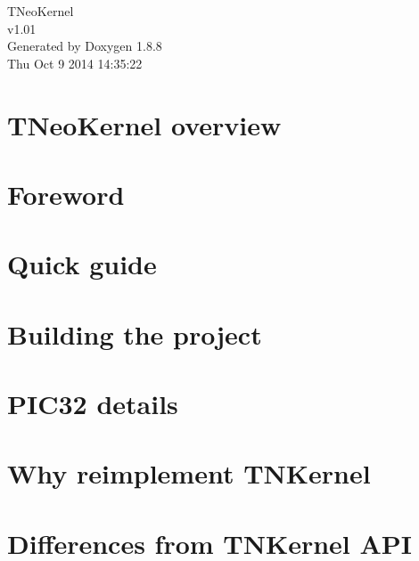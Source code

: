 \documentclass[twoside]{book}
\newcommand{\+}{\discretionary{\mbox{\scriptsize$\hookleftarrow$}}{}{}}
\newcommand{\clearemptydoublepage}{%
  \newpage{\pagestyle{empty}\cleardoublepage}%
}
\begin{document}
\hypersetup{pageanchor=false,
             bookmarks=true,
             bookmarksnumbered=true,
             pdfencoding=unicode
            }
\begin{titlepage}
\vspace*{7cm}
\begin{center}%
{\Large T\+Neo\+Kernel \\[1ex]\large v1.\+01 }\\
\vspace*{1cm}
{\large Generated by Doxygen 1.8.8}\\
\vspace*{0.5cm}
{\small Thu Oct 9 2014 14:35:22}\\
\end{center}
\end{titlepage}
\clearemptydoublepage
\tableofcontents
\clearemptydoublepage
{}
\hypersetup{pageanchor=true}

\chapter{T\+Neo\+Kernel overview}
\label{index}\hypertarget{index}{}
\chapter{Foreword}
\label{foreword}
\hypertarget{foreword}{}

\chapter{Quick guide}
\label{quick_guide}
\hypertarget{quick_guide}{}

\chapter{Building the project}
\label{building}
\hypertarget{building}{}

\chapter{P\+I\+C32 details}
\label{pic32_details}
\hypertarget{pic32_details}{}

\chapter{Why reimplement T\+N\+Kernel}
\label{why_reimplement}
\hypertarget{why_reimplement}{}

\chapter{Differences from T\+N\+Kernel A\+P\+I}
\label{tnkernel_diff}
\hypertarget{tnkernel_diff}{}

\end{document}
